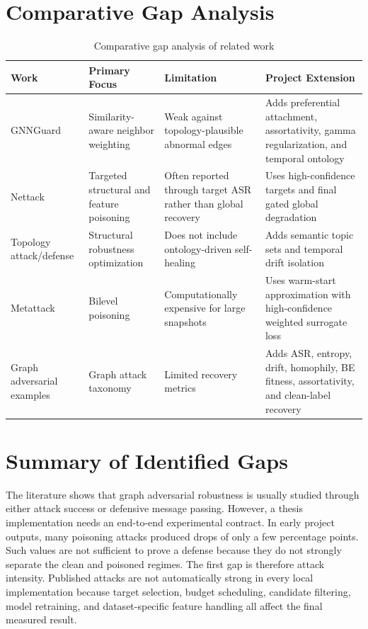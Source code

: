 \documentclass[12pt,oneside]{report}
\begin{document}
\section{Comparative Gap Analysis}
\begin{table}[H]
\centering
\caption{Comparative gap analysis of related work}
\begin{tabular}{p{1.0in}p{1.3in}p{1.45in}p{1.55in}}
\toprule
\textbf{Work} & \textbf{Primary Focus} & \textbf{Limitation} & \textbf{Project Extension}\\
\midrule
GNNGuard \cite{zhang2020gnnguard} & Similarity-aware neighbor weighting & Weak against topology-plausible abnormal edges & Adds preferential attachment, assortativity, gamma regularization, and temporal ontology\\
Nettack \cite{zugner2018nettack} & Targeted structural and feature poisoning & Often reported through target ASR rather than global recovery & Uses high-confidence targets and final gated global degradation\\
Topology attack/defense \cite{xu2019topology} & Structural robustness optimization & Does not include ontology-driven self-healing & Adds semantic topic sets and temporal drift isolation\\
Metattack \cite{zugner2019metattack} & Bilevel poisoning & Computationally expensive for large snapshots & Uses warm-start approximation with high-confidence weighted surrogate loss\\
Graph adversarial examples \cite{wu2019adversarial} & Graph attack taxonomy & Limited recovery metrics & Adds ASR, entropy, drift, homophily, BE fitness, assortativity, and clean-label recovery\\
\bottomrule
\end{tabular}
\end{table}

\section{Summary of Identified Gaps}
The literature shows that graph adversarial robustness is usually studied through either attack success or defensive message passing. However, a thesis implementation needs an end-to-end experimental contract. In early project outputs, many poisoning attacks produced drops of only a few percentage points. Such values are not sufficient to prove a defense because they do not strongly separate the clean and poisoned regimes. The first gap is therefore attack intensity. Published attacks are not automatically strong in every local implementation because target selection, budget scheduling, candidate filtering, model retraining, and dataset-specific feature handling all affect the final measured result.
\end{document}
